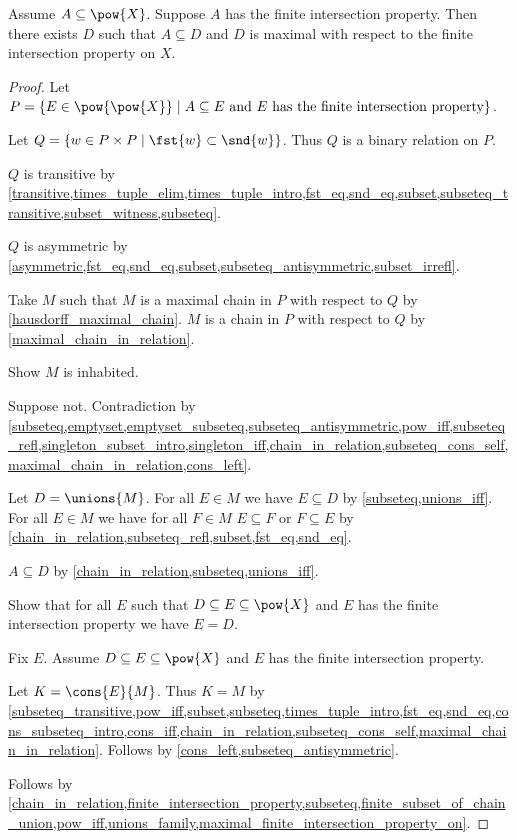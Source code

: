 \begin{theorem}\label{zorn_subset_family}
    Assume $A\subseteq\pow{X}$.
    Suppose $A$ has the finite intersection property.
    Then there exists $D$ such that
        $A\subseteq D$ and
        $D$ is maximal with respect to the finite intersection property on $X$.
\end{theorem}
\begin{proof}
    Let $P=\{E\in\pow{\pow{X}}\mid \text{$A\subseteq E$ and $E$ has the finite intersection property}\}$.

    Let $Q=\{w\in P\times P\mid \text{$\fst{w}\subset\snd{w}$}\}$.
    Thus $Q$ is a binary relation on $P$.

    $Q$ is transitive
        by \cref{transitive,times_tuple_elim,times_tuple_intro,fst_eq,snd_eq,subset,subseteq_transitive,subset_witness,subseteq}.

    $Q$ is asymmetric
        by \cref{asymmetric,fst_eq,snd_eq,subset,subseteq_antisymmetric,subset_irrefl}.

    Take $M$ such that $M$ is a maximal chain in $P$ with respect to $Q$
        by \cref{hausdorff_maximal_chain}.
    $M$ is a chain in $P$ with respect to $Q$ by \cref{maximal_chain_in_relation}.

    Show $M$ is inhabited.
    \begin{subproof}
        Suppose not.
        Contradiction
            by \cref{subseteq,emptyset,emptyset_subseteq,subseteq_antisymmetric,pow_iff,subseteq_refl,singleton_subset_intro,singleton_iff,chain_in_relation,subseteq_cons_self,maximal_chain_in_relation,cons_left}.
    \end{subproof}

    Let $D=\unions{M}$.
    For all $E\in M$ we have $E\subseteq D$ by \cref{subseteq,unions_iff}.
    For all $E\in M$ we have for all $F\in M$
        $E\subseteq F$ or $F\subseteq E$
        by \cref{chain_in_relation,subseteq_refl,subset,fst_eq,snd_eq}.

    $A\subseteq D$ by \cref{chain_in_relation,subseteq,unions_iff}.

    Show that for all $E$ such that $D\subseteq E\subseteq\pow{X}$ and
        $E$ has the finite intersection property we have $E=D$.
    \begin{subproof}
        Fix $E$.
        Assume $D\subseteq E\subseteq\pow{X}$ and $E$ has the finite intersection property.

        Let $K=\cons{E}{M}$.
        Thus $K=M$
            by \cref{subseteq_transitive,pow_iff,subset,subseteq,times_tuple_intro,fst_eq,snd_eq,cons_subseteq_intro,cons_iff,chain_in_relation,subseteq_cons_self,maximal_chain_in_relation}.
        Follows by \cref{cons_left,subseteq_antisymmetric}.
    \end{subproof}

    Follows by \cref{chain_in_relation,finite_intersection_property,subseteq,finite_subset_of_chain_union,pow_iff,unions_family,maximal_finite_intersection_property_on}.
\end{proof}

